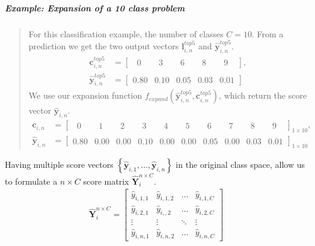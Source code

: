 \subparagraph{Example: Expansion of a 10 class problem} 
\blockquote[]{	 	
	For this classification example, the number of classes $C=10$. From a prediction we get the two output vectors $\mathbf{l}_{i,n}^{top5}$ and $ \mathbf{\hat{y}}_{i,n}^{top5}$.
	\begin{align*}
	\mathbf{c}_{i,n}^{top5} &= \begin{bmatrix}
	\phantom{0}0\phantom{.0} & \phantom{0}3\phantom{.0} & \phantom{0}6\phantom{.0} & \phantom{0}8\phantom{.0} & \phantom{0}9\phantom{.0}
	\end{bmatrix},\\
	\mathbf{\hat{y}}_{i,n}^{top5} &= \begin{bmatrix}
	0.80 & 0.10 & 0.05 & 0.03 & 0.01
	\end{bmatrix}
	\end{align*}
	We use our expansion function $ f_{expand}\left(\bm{\hat{y}}_{i,n}^{top5},\mathbf{c}_{i,n}^{top5}\right) $, which return the score vector $ \mathbf{\hat{y}}_{i,n}$.
	\begin{align*}
	\mathbf{c}_{i,n} &= \begin{bmatrix}
	\phantom{0}0\phantom{.0} & \phantom{0}1\phantom{.0} & \phantom{0}2\phantom{.0} & \phantom{0}3\phantom{.0} & \phantom{0}4\phantom{.0} & \phantom{0}5\phantom{.0} & \phantom{0}6\phantom{.0} & \phantom{0}7\phantom{.0} & \phantom{0}8\phantom{.0} & \phantom{0}9\phantom{.0}
	\end{bmatrix}_{1 \times 10},\\
	\mathbf{\hat{y}}_{i,n}  &= \begin{bmatrix}
	0.80 & 0.00 & 0.00 & 0.10 & 0.00 & 0.00 & 0.05 & 0.00 & 0.03 & 0.01
	\end{bmatrix}_{1 \times 10}
	\end{align*}
}      

Having multiple score vectors $ \left\{\bm{\hat{y}}_{i,1}, \dots, \bm{\hat{y}}_{i,n}\right\}  $ in the original class space, allow us to formulate a $ n \times C $ score matrix $ \bm{\hat{Y}}_{i}^{n \times C} $.
\begin{align}
	\bm{\hat{Y}}_{i}^{n \times C} =
	\begin{bmatrix}
		\hat{y}_{i,1,1} & \hat{y}_{i,1,2} & \dots & \hat{y}_{i,1,C} \\
		\hat{y}_{i,2,1} & \hat{y}_{i,,2} & \dots & \hat{y}_{i,2,C} \\
		\vdots & \vdots & \ddots & \vdots \\
		\hat{y}_{i,n,1} & \hat{y}_{i,n,2} & \dots & \hat{y}_{i,n,C}
	\end{bmatrix}
\end{align}

